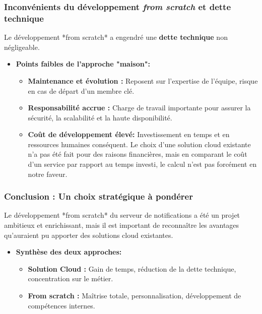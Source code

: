 \subsubsection{Inconvénients du développement {\it from scratch} et dette technique}

Le développement *from scratch* a engendré une {\bf dette technique} non négligeable.

\begin{itemize}
\item {\bf Points faibles de l'approche "maison":}
	\begin{itemize}
    \item {\bf Maintenance et évolution :} Reposent sur l'expertise de l'équipe, risque en cas de départ d'un membre clé.
    \item {\bf Responsabilité accrue :} Charge de travail importante pour assurer la sécurité, la scalabilité et la haute disponibilité.
    \item {\bf Coût de développement élevé:} Investissement en temps et en ressources humaines conséquent. Le choix d'une solution cloud existante n'a pas été fait pour des raisons financières, mais en comparant le coût d'un service par rapport au temps investi, le calcul n'est pas forcément en notre faveur.
	\end{itemize}
\end{itemize}

\subsubsection{Conclusion : Un choix stratégique à pondérer}

Le développement *from scratch* du serveur de notifications a été un projet ambitieux et enrichissant, mais il est important de reconnaître les avantages qu'auraient pu apporter des solutions cloud existantes.

\begin{itemize}
\item {\bf Synthèse des deux approches:}
	\begin{itemize}
    \item {\bf Solution Cloud :} Gain de temps, réduction de la dette technique, concentration sur le métier.
    \item {\bf From scratch :} Maîtrise totale, personnalisation, développement de compétences internes.
	\end{itemize}
\end{itemize}

